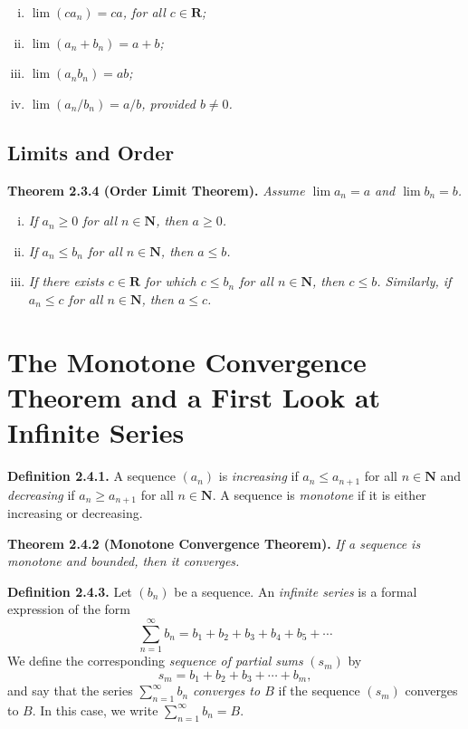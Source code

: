 \documentclass[12pt]{report}
\newcommand{\R}{\textbf{R}}
\newcommand{\N}{\textbf{N}}
\begin{document}
\begin{enumerate}[(i)]
\item \textit{$\lim(ca_n)=ca$, for all $c\in\R$;}
\item \textit{$\lim(a_n+b_n)=a+b$;}
\item \textit{$\lim(a_nb_n)=ab$;}
\item \textit{$\lim(a_n/b_n)=a/b$, provided $b\neq 0$.}
\end{enumerate}
\bigskip

\subsection*{Limits and Order}

\noindent \textbf{Theorem 2.3.4 (Order Limit Theorem).} \textit{Assume $\lim a_n=a$ and $\lim b_n=b$.}

\begin{enumerate}[(i)]
\item \textit{If $a_n\geq 0$ for all $n\in\N$, then $a\geq 0$.}
\item \textit{If $a_n\leq b_n$ for all $n\in\N$, then $a\leq b$.}
\item \textit{If there exists $c\in\R$ for which $c\leq b_n$ for all $n\in\N$, then $c\leq b$.  Similarly, if $a_n\leq c$ for all $n\in\N$, then $a\leq c$.}
\end{enumerate}
\bigskip

\section{The Monotone Convergence Theorem and a First Look at Infinite Series}

\noindent \textbf{Definition 2.4.1.} A sequence $(a_n)$ is \textit{increasing} if $a_n\leq a_{n+1}$ for all $n\in\N$ and \textit{decreasing} if $a_n\geq a_{n+1}$ for all $n\in\N$.  A sequence is \textit{monotone} if it is either increasing or decreasing.
\bigskip

\noindent \textbf{Theorem 2.4.2 (Monotone Convergence Theorem).} \textit{If a sequence is monotone and bounded, then it converges.}
\bigskip

\noindent \textbf{Definition 2.4.3.} Let $(b_n)$ be a sequence.  An \textit{infinite series} is a formal expression of the form
\[\sum_{n=1}^\infty b_n=b_1+b_2+b_3+b_4+b_5+\cdots \]
\noindent We define the corresponding \textit{sequence of partial sums} $(s_m)$ by
\[s_m=b_1+b_2+b_3+\cdots+b_m,\]
\noindent and say that the series $\sum_{n=1}^\infty b_n$ \textit{converges to $B$} if the sequence $(s_m)$ converges to $B$.  In this case, we write $\sum_{n=1}^\infty b_n=B$.
\bigskip
\end{document}
